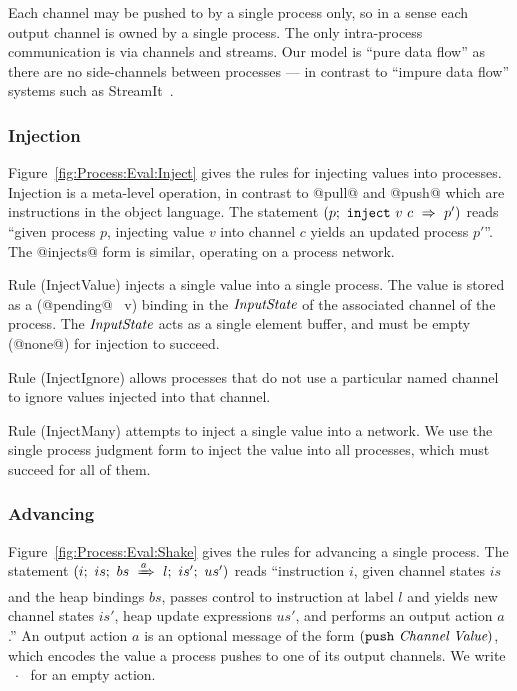 Each channel may be pushed to by a single process only, so in a sense each output channel is owned by a single process. The only intra-process communication is via channels and streams. Our model is ``pure data flow'' as there are no side-channels between processes --- in contrast to ``impure data flow'' systems such as StreamIt~\cite{thies2002streamit}.


\subsubsection{Injection}
Figure~\ref{fig:Process:Eval:Inject} gives the rules for injecting values into processes. Injection is a meta-level operation, in contrast to @pull@ and @push@ which are instructions in the object language. The statement $(p;~\texttt{inject}~v~c~\Rightarrow~p')$ reads ``given process $p$, injecting value $v$ into channel $c$ yields an updated process $p'$''. The @injects@ form is similar, operating on a process network.

Rule (InjectValue) injects a single value into a single process. The value is stored as a (@pending@~ v) binding in the $\textit{InputState}$ of the associated channel of the process. The $\textit{InputState}$ acts as a single element buffer, and must be empty (@none@) for injection to succeed.

Rule (InjectIgnore) allows processes that do not use a particular named channel to ignore values injected into that channel.

Rule (InjectMany) attempts to inject a single value into a network. We use the single process judgment form to inject the value into all processes, which must succeed for all of them.






\subsubsection{Advancing}
Figure~\ref{fig:Process:Eval:Shake} gives the rules for advancing a single process. The statement $(i;~is;~bs~\xRightarrow{a}~l;~is';~us')$ reads ``instruction $i$, given channel states $is$ and the heap bindings $bs$, passes control to instruction at label $l$ and yields new channel states $is'$, heap update expressions $us'$, and performs an output action $a$.'' An output action $a$ is an optional message of the form $(\texttt{push}~\textit{Channel}~\textit{Value})$, which encodes the value a process pushes to one of its output channels. We write ~$\cdot$~ for an empty action. 

